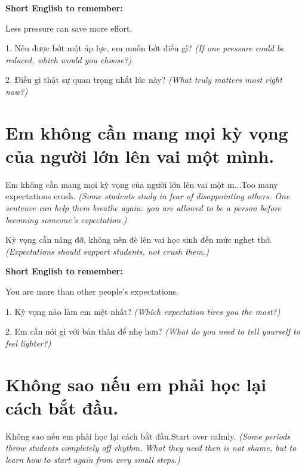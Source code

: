 \begin{ghinhoanh}
\textbf{Short English to remember:}

Less pressure can save more effort.

\end{ghinhoanh}

\begin{tuhocnhanh}
1. Nếu được bớt một áp lực, em muốn bớt điều gì? \textit{(If one pressure could be reduced, which would you choose?)}

2. Điều gì thật sự quan trọng nhất lúc này? \textit{(What truly matters most right now?)}
\end{tuhocnhanh}
\ngancach


\section{Em không cần mang mọi kỳ vọng của người lớn lên vai một mình.}
\begin{truyen}{Em không cần mang mọi kỳ vọng của người lớn lên vai một m...}{Too many expectations crush.}
\textit{(Some students study in fear of disappointing others. One sentence can help them breathe again: you are allowed to be a person before becoming someone's expectation.)}
\end{truyen}

\begin{baihoc}
Kỳ vọng cần nâng đỡ, không nên đè lên vai học sinh đến mức nghẹt thở.
\textit{(Expectations should support students, not crush them.)}
\end{baihoc}

\begin{ghinhoanh}
\textbf{Short English to remember:}

You are more than other people's expectations.

\end{ghinhoanh}

\begin{tuhocnhanh}
1. Kỳ vọng nào làm em mệt nhất? \textit{(Which expectation tires you the most?)}

2. Em cần nói gì với bản thân để nhẹ hơn? \textit{(What do you need to tell yourself to feel lighter?)}
\end{tuhocnhanh}
\ngancach


\section{Không sao nếu em phải học lại cách bắt đầu.}
\begin{truyen}{Không sao nếu em phải học lại cách bắt đầu.}{Start over calmly.}
\textit{(Some periods throw students completely off rhythm. What they need then is not shame, but to learn how to start again from very small steps.)}
\end{truyen}

